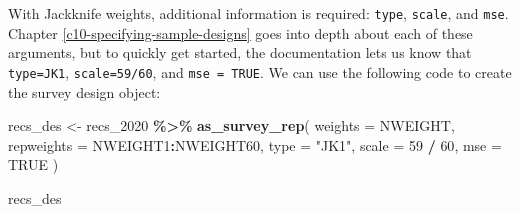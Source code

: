 \documentclass[
]{krantz}
\makeatletter
\newenvironment{Shaded}{\begin{snugshade}}{\end{snugshade}}
\newcommand{\AttributeTok}[1]{\textcolor[rgb]{0.27,0.27,0.27}{#1}}
\newcommand{\ConstantTok}[1]{\textcolor[rgb]{0.37,0.37,0.37}{#1}}
\newcommand{\DecValTok}[1]{\textcolor[rgb]{0.06,0.06,0.06}{#1}}
\newcommand{\FunctionTok}[1]{\textcolor[rgb]{0.27,0.27,0.27}{\textbf{#1}}}
\newcommand{\NormalTok}[1]{#1}
\newcommand{\OtherTok}[1]{\textcolor[rgb]{0.37,0.37,0.37}{#1}}
\newcommand{\SpecialCharTok}[1]{\textcolor[rgb]{0.43,0.43,0.43}{\textbf{#1}}}
\newcommand{\StringTok}[1]{\textcolor[rgb]{0.5,0.5,0.5}{#1}}
\newenvironment{kframe}{%
\medskip{}
\setlength{\fboxsep}{.8em}
 \def\at@end@of@kframe{}%
 \ifinner\ifhmode%
  \def\at@end@of@kframe{\end{minipage}}%
  \begin{minipage}{\columnwidth}%
 \fi\fi%
 \def\FrameCommand##1{\hskip\@totalleftmargin \hskip-\fboxsep
 \colorbox{shadecolor}{##1}\hskip-\fboxsep
     \hskip-\linewidth \hskip-\@totalleftmargin \hskip\columnwidth}%
 \MakeFramed {\advance\hsize-\width
   \@totalleftmargin\z@ \linewidth\hsize
   \@setminipage}}%
 {\par\unskip\endMakeFramed%
 \at@end@of@kframe}
\renewenvironment{Shaded}{\begin{kframe}}{\end{kframe}}
\makeatother
\begin{document}
With Jackknife weights, additional information is required: \texttt{type}, \texttt{scale}, and \texttt{mse}. Chapter \ref{c10-specifying-sample-designs} goes into depth about each of these arguments, but to quickly get started, the documentation lets us know that \texttt{type=JK1}, \texttt{scale=59/60}, and \texttt{mse\ =\ TRUE}. We can use the following code to create the survey design object:

\begin{Shaded}
\begin{Highlighting}[]
\NormalTok{recs\_des }\OtherTok{\textless{}{-}}\NormalTok{ recs\_2020 }\SpecialCharTok{\%\textgreater{}\%}
  \FunctionTok{as\_survey\_rep}\NormalTok{(}
    \AttributeTok{weights =}\NormalTok{ NWEIGHT,}
    \AttributeTok{repweights =}\NormalTok{ NWEIGHT1}\SpecialCharTok{:}\NormalTok{NWEIGHT60,}
    \AttributeTok{type =} \StringTok{"JK1"}\NormalTok{,}
    \AttributeTok{scale =} \DecValTok{59} \SpecialCharTok{/} \DecValTok{60}\NormalTok{,}
    \AttributeTok{mse =} \ConstantTok{TRUE}
\NormalTok{  )}

\NormalTok{recs\_des}
\end{Highlighting}
\end{Shaded}
\end{document}
